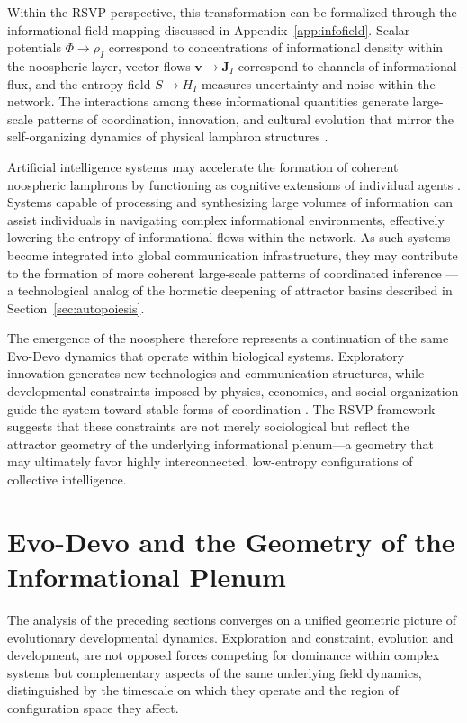 \documentclass[12pt]{article}
\begin{document}
Within the RSVP perspective, this transformation can be formalized through the informational field mapping discussed in Appendix~\ref{app:infofield}. Scalar potentials $\Phi \to \rho_I$ correspond to concentrations of informational density within the noospheric layer, vector flows $\mathbf{v} \to \mathbf{J}_I$ correspond to channels of informational flux, and the entropy field $S \to H_I$ measures uncertainty and noise within the network. The interactions among these informational quantities generate large-scale patterns of coordination, innovation, and cultural evolution that mirror the self-organizing dynamics of physical lamphron structures \cite{haken1983,prigogine1984}.

Artificial intelligence systems may accelerate the formation of coherent noospheric lamphrons by functioning as cognitive extensions of individual agents \cite{faggin2024,smart2023}. Systems capable of processing and synthesizing large volumes of information can assist individuals in navigating complex informational environments, effectively lowering the entropy of informational flows within the network. As such systems become integrated into global communication infrastructure, they may contribute to the formation of more coherent large-scale patterns of coordinated inference \cite{friston2010,barabasi2016}---a technological analog of the hormetic deepening of attractor basins described in Section~\ref{sec:autopoiesis}.

The emergence of the noosphere therefore represents a continuation of the same Evo-Devo dynamics that operate within biological systems. Exploratory innovation generates new technologies and communication structures, while developmental constraints imposed by physics, economics, and social organization guide the system toward stable forms of coordination \cite{smart2009,smart2023}. The RSVP framework suggests that these constraints are not merely sociological but reflect the attractor geometry of the underlying informational plenum---a geometry that may ultimately favor highly interconnected, low-entropy configurations of collective intelligence.

\section{Evo-Devo and the Geometry of the Informational Plenum}
\label{sec:geometry}

The analysis of the preceding sections converges on a unified geometric picture of evolutionary developmental dynamics. Exploration and constraint, evolution and development, are not opposed forces competing for dominance within complex systems but complementary aspects of the same underlying field dynamics, distinguished by the timescale on which they operate and the region of configuration space they affect.
\end{document}
